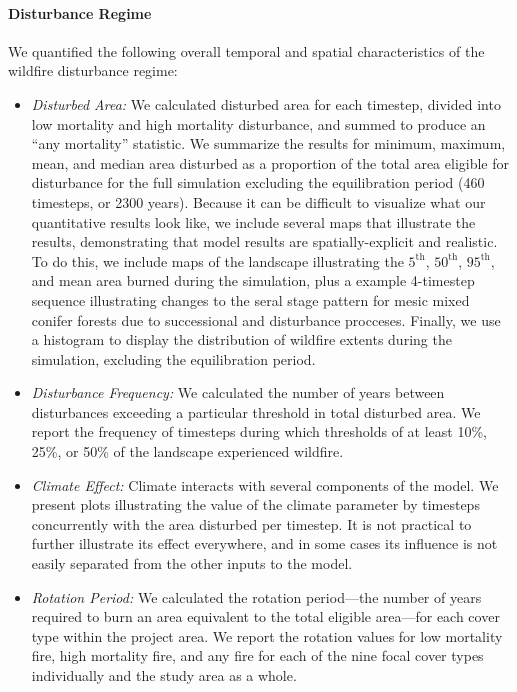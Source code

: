 \paragraph{Disturbance Regime} We quantified the following overall temporal and spatial characteristics of the wildfire disturbance regime:
\begin{itemize}
	\item \emph{Disturbed Area:} We calculated disturbed area for each timestep, divided into low mortality and high mortality disturbance, and summed to produce an ``any mortality'' statistic. We summarize the results for minimum, maximum, mean, and median area disturbed as a proportion of the total area eligible for disturbance for the full simulation excluding the equilibration period (460 timesteps, or 2300 years). Because it can be difficult to visualize what our quantitative results look like, we include several maps that illustrate the results, demonstrating that model results are spatially-explicit and realistic. To do this, we include maps of the landscape illustrating the $5^{\text{th}}$, $50^{\text{th}}$, $95^{\text{th}}$, and mean area burned during the simulation, plus a example 4-timestep sequence illustrating changes to the seral stage pattern for mesic mixed conifer forests due to successional and disturbance procceses. Finally, we use a histogram to display the distribution of wildfire extents during the simulation, excluding the equilibration period.
	\item \emph{Disturbance Frequency:} We calculated the number of years between disturbances exceeding a particular threshold in total disturbed area. We report the frequency of timesteps during which thresholds of at least 10\%, 25\%, or 50\% of the landscape experienced wildfire.
	\item \emph{Climate Effect:} Climate interacts with several components of the model. We present plots illustrating the value of the climate parameter by timesteps concurrently with the area disturbed per timestep. It is not practical to further illustrate its effect everywhere, and in some cases its influence is not easily separated from the other inputs to the model. 
	\item \emph{Rotation Period:} We calculated the rotation period---the number of years required to burn an area equivalent to the total eligible area---for each cover type within the project area. We report the rotation values for low mortality fire, high mortality fire, and any fire for each of the nine focal cover types individually and the study area as a whole.

\end{itemize}

